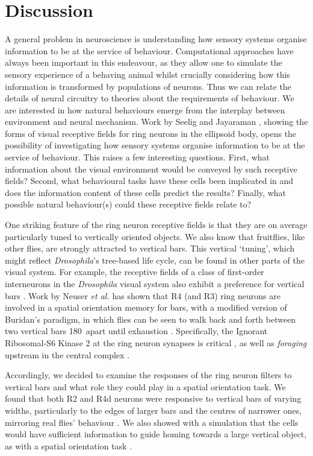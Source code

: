 \section*{Discussion}
A general problem in neuroscience is understanding how sensory systems organise information to be at the service of behaviour. Computational approaches have always been important in this endeavour, as they allow one to simulate the sensory experience of a behaving animal whilst crucially considering how this information is transformed by populations of neurons. Thus we can relate the details of neural circuitry to theories about the requirements of behaviour.
We are interested in how natural behaviours emerge from the interplay between environment and neural mechanism.
Work by Seelig and Jayaraman \cite{Seelig2013}, showing the forms of visual receptive fields for ring neurons in the ellipsoid body, opens the possibility of investigating how sensory systems organise information to be at the service of behaviour.
This raises a few interesting questions.
First, what information about the visual environment would be conveyed by such receptive fields?
Second, what behavioural tasks have these cells been implicated in and does the information content of these cells predict the results?
Finally, what possible natural behaviour(s) could these receptive fields relate to?

One striking feature of the ring neuron receptive fields is that they are on average particularly tuned to vertically oriented objects.
We also know that fruitflies, like other flies, are strongly attracted to vertical bars.
This vertical `tuning', which might reflect \emph{Drosophila}'s tree-based life cycle, can be found in other parts of the visual system.
For example, the receptive fields of a class of first-order interneurons in the \emph{Drosophila} visual system also exhibit a preference for vertical bars \cite{Freifeld2013}.
Work by Neuser \emph{et al.} \cite{Neuser2008} has shown that R4 (and R3) ring neurons are involved in a spatial orientation memory for bars, with a modified version of Buridan's paradigm, in which flies can be seen to walk back and forth between two vertical bars 180\degree\ apart until exhaustion \cite{Bulthoff1982,Gotz1980}.
Specifically, the Ignorant Ribosomal-S6 Kinase 2 at the ring neuron synapses is critical \cite{Neuser2008}, as well as \emph{foraging} upstream in the central complex \cite{Kuntz2012}.

Accordingly, we decided to examine the responses of the ring neuron filters to vertical bars and what role they could play in a spatial orientation task.
We found that both R2 and R4d neurons were responsive to vertical bars of varying widths, particularly to the edges of larger bars and the centres of narrower ones, mirroring real flies' behaviour \cite{Osorio1990}.
We also showed with a simulation that the cells would have sufficient information to guide homing towards a large vertical object, as with a spatial orientation task \cite{Neuser2008}.

